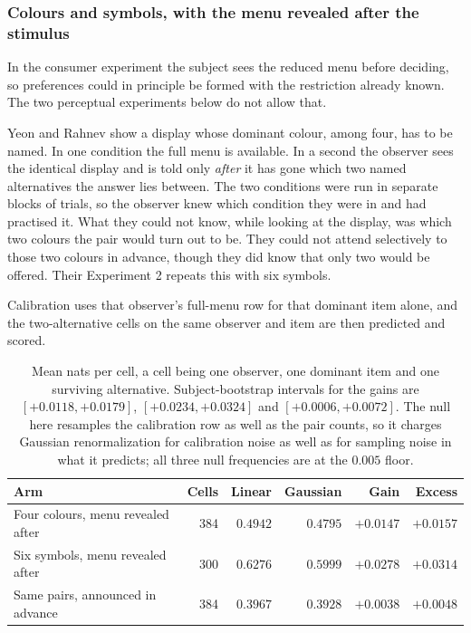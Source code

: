 \documentclass[11pt]{article}
\begin{document}
\subsubsection{Colours and symbols, with the menu revealed after the stimulus}
\label{sec:after}

In the consumer experiment the subject sees the reduced menu before deciding, so preferences
could in principle be formed with the restriction already known. The two perceptual experiments
below do not allow that.

Yeon and Rahnev \cite{yeonrahnev2020} show a display whose dominant colour, among four, has
to be named. In one condition the full menu is available. In a second the observer sees the
identical display and is told only \emph{after} it has gone which two named alternatives the
answer lies between. The two conditions were run in separate blocks of trials, so the observer
knew which condition they were in and had practised it. What they could not know, while looking
at the display, was which two colours the pair would turn out to be. They could not attend
selectively to those two colours in advance, though they did know that only two would be
offered. Their Experiment 2 repeats this with six symbols.

Calibration uses that observer's full-menu row for that dominant item alone, and the
two-alternative cells on the same observer and item are then predicted and scored.

\begin{table}[ht]
\centering
\small
\begin{tabular}{lrrrrr}
\toprule
Arm & Cells & Linear & Gaussian & Gain & Excess \\
\midrule
Four colours, menu revealed after & 384 & $0.4942$ & $0.4795$ & $+0.0147$ & $+0.0157$ \\
Six symbols, menu revealed after & 300 & $0.6276$ & $0.5999$ & $+0.0278$ & $+0.0314$ \\
\midrule
Same pairs, announced in advance & 384 & $0.3967$ & $0.3928$ & $+0.0038$ & $+0.0048$ \\
\bottomrule
\end{tabular}
\caption{Mean nats per cell, a cell being one observer, one dominant item and one surviving
alternative. Subject-bootstrap intervals for the gains are $[+0.0118, +0.0179]$,
$[+0.0234, +0.0324]$ and $[+0.0006, +0.0072]$. The null here resamples the calibration row
as well as the pair counts, so it charges Gaussian renormalization for calibration noise as well as for
sampling noise in what it predicts; all three null frequencies are at the $0.005$ floor.}
\label{tab:after}
\end{table}
\end{document}
